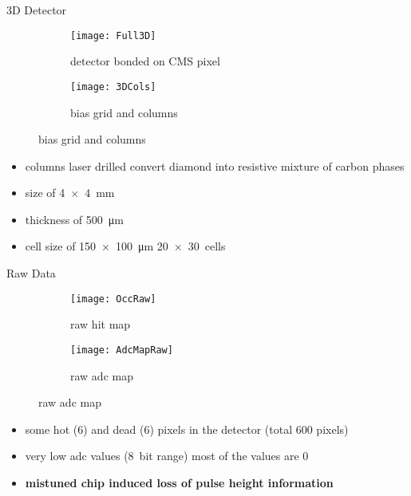 \begin{frame}{3D Detector}
	
	\begin{figure}
		\centering
		\begin{subfigure}{0.4\textwidth}  
			\centering 
			\texttt{[image: Full3D]}
			\caption{detector bonded on CMS pixel}
		\end{subfigure}
		\hspace*{10pt}
		\begin{subfigure}{0.4\textwidth} 
			\centering 
			\vspace*{.1\textheight}
			\texttt{[image: 3DCols]}
			\caption{bias grid and columns}
		\end{subfigure}
	\end{figure}\vspace*{-10pt}

	\begin{itemize}
		\itemfill
		\item columns laser drilled \ra convert diamond into resistive mixture of carbon phases
		\item size of \SI{4x4}{\milli\meter}
		\item thickness of \SI{500}{\micro\meter}
		\item cell size of \SI{150x100}{\micro\meter} \ra \SI{20x30}{cells}
	\end{itemize}

\end{frame}
\begin{frame}{Raw Data}

	\vspace*{-10pt}
	\begin{figure}
		\centering
		\begin{subfigure}{0.45\textwidth}  
			\centering 
			\texttt{[image: OccRaw]}
			\caption{raw hit map}
		\end{subfigure}
		\hspace*{10pt}
		\begin{subfigure}{0.45\textwidth} 
			\centering 
			\texttt{[image: AdcMapRaw]}
			\caption{raw adc map}
		\end{subfigure}
	\end{figure}\vspace*{-10pt}
	
	\begin{itemize}
		\itemfill
		\item some hot (6) and dead (6) pixels in the detector (total 600 pixels)
		\item very low adc values (\SI{8}{bit} range) \ra most of the values are 0
		\item \textcolor{RedOrange}{\textbf{mistuned chip induced loss of pulse height information}}
	\end{itemize}

\end{frame}
